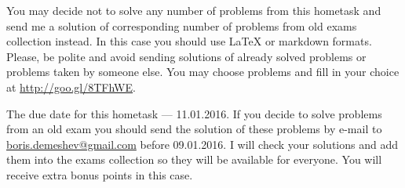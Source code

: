 \documentclass[12pt,a4paper]{article}
\begin{document}
\vspace{2cm}

You may decide not to solve any number of problems from this hometask and send me a solution of corresponding number of problems from old exams collection instead. In this case you should use \LaTeX{} or markdown formats. Please, be polite and avoid sending solutions of already solved problems or problems taken by someone else. You may choose problems and fill in your choice at \url{http://goo.gl/8TFhWE}.

The due date for this hometask --- 11.01.2016. If you decide to solve problems from an old exam you should send the solution of these problems by e-mail to \href{mailto:boris.demeshev@gmail.com}{boris.demeshev@gmail.com} before 09.01.2016. I will check your solutions and add them into the exams collection so they will be available for everyone. You will receive extra bonus points in this case.
\end{document}
